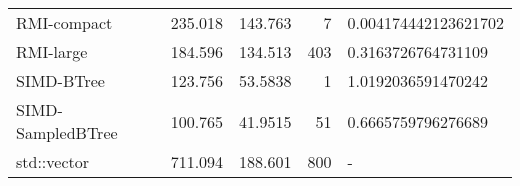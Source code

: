 \begin{tabular}{lrrrl}
 RMI-compact       &                235.018 &              143.763  &            7 & 0.004174442123621702 \\
 RMI-large         &                184.596 &              134.513  &          403 & 0.3163726764731109   \\
 SIMD-BTree        &                123.756 &               53.5838 &            1 & 1.0192036591470242   \\
 SIMD-SampledBTree &                100.765 &               41.9515 &           51 & 0.6665759796276689   \\
 std::vector       &                711.094 &              188.601  &          800 & -                    \\
\hline
\end{tabular}